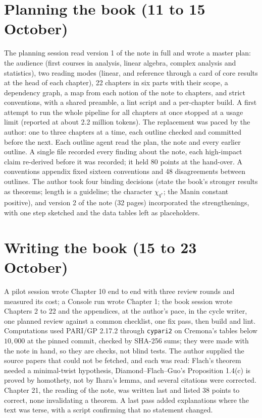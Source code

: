 \documentclass[11pt,a4paper]{article}
\begin{document}
\section{Planning the book (11 to 15 October)}
The planning session read version 1 of the note in full and wrote a master plan: the audience (first courses in analysis, linear algebra, complex analysis and statistics), two reading modes (linear, and reference through a card of core results at the head of each chapter), 22 chapters in six parts with their scope, a dependency graph, a map from each notion of the note to chapters, and strict conventions, with a shared preamble, a lint script and a per-chapter build. A first attempt to run the whole pipeline for all chapters at once stopped at a usage limit (reported at about 2.2 million tokens). The replacement was paced by the author: one to three chapters at a time, each outline checked and committed before the next. Each outline agent read the plan, the note and every earlier outline. A single file recorded every finding about the note, each high-impact claim re-derived before it was recorded; it held 80 points at the hand-over. A conventions appendix fixed sixteen conventions and 48 disagreements between outlines. The author took four binding decisions (state the book's stronger results as theorems; length is a guideline; the character $\chi_{q^*}$; the Manin constant positive), and version 2 of the note (32 pages) incorporated the strengthenings, with one step sketched and the data tables left as placeholders.

\section{Writing the book (15 to 23 October)}
A pilot session wrote Chapter 10 end to end with three review rounds and measured its cost; a Console run wrote Chapter 1; the book session wrote Chapters 2 to 22 and the appendices, at the author's pace, in the cycle writer, one planned review against a common checklist, one fix pass, then build and lint. Computations used PARI/GP 2.17.2 through \texttt{cypari2} on Cremona's tables below $10{,}000$ at the pinned commit, checked by SHA-256 sums; they were made with the note in hand, so they are checks, not blind tests. The author supplied the source papers that could not be fetched, and each was read: Flach's theorem needed a minimal-twist hypothesis, Diamond--Flach--Guo's Proposition 1.4(c) is proved by homothety, not by Ihara's lemma, and several citations were corrected. Chapter 21, the reading of the note, was written last and listed 38 points to correct, none invalidating a theorem. A last pass added explanations where the text was terse, with a script confirming that no statement changed.
\end{document}
